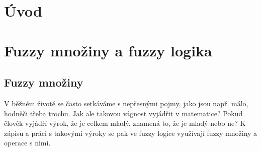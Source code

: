 


\newtheorem{definition}{Definice}
\newtheorem{remark}{Pozn\'amka}
\newtheorem{example}{Příklad}
\newtheorem{graph}{Obr\' azek}
\newtheorem{sentence}{Věta}
\newtheorem{tabul}{Tabulka}

\chapter{Úvod}





\chapter {Fuzzy mno\v ziny a fuzzy logika}
\section{Fuzzy mno\v ziny} 


V běžném životě se často setkáváme s nepřesnými pojmy, jako jsou např. \clqq málo\crqq, \clqq hodně\crqq \space či třeba \clqq trochu\crqq \space. Jak ale takovou vágnost vyjádřit v matematice? Pokud člověk vyjádří výrok, že je \clqq celkem mladý\crqq, znamená to, že je mladý nebo ne? K zápisu a práci s takovými výroky se pak ve fuzzy logice využívají fuzzy množiny a operace s nimi.

